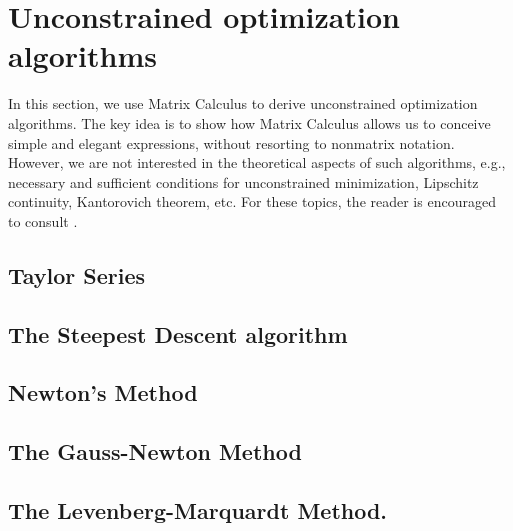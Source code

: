 \section{Unconstrained optimization algorithms}

In this section, we use Matrix Calculus to derive unconstrained optimization algorithms. The key idea is to show how Matrix Calculus allows us to conceive simple and elegant expressions, without resorting to nonmatrix notation. However, we are not interested in the theoretical aspects of such algorithms, e.g., necessary and sufficient conditions for unconstrained minimization, Lipschitz continuity, Kantorovich theorem, etc. For these topics, the reader is encouraged to consult \cite{dennisNumericalMethodsUnconstrained1996}.

\subsection{Taylor Series}


\subsection{The Steepest Descent algorithm}


\subsection{Newton's Method}


\subsection{The Gauss-Newton Method}


\subsection{The Levenberg-Marquardt Method.}

